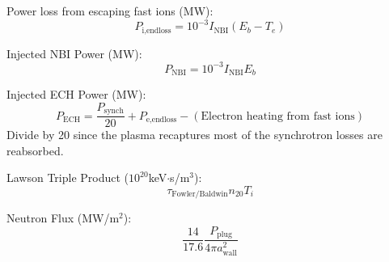 Power loss from escaping fast ions (MW):
\begin{equation}
    P_{\text{i,endloss}} = 10^{-3} I_{\text{NBI}} \left(E_b-T_e\right)
\end{equation}

Injected NBI Power (MW):
\begin{equation}
    P_{\text{NBI}} = 10^{-3}I_{\text{NBI}} E_b
\end{equation}

Injected ECH Power (MW): 
\begin{equation}
    P_{\text{ECH}} = \frac{P_{\text{synch}}}{20} +P_{\text{e,endloss}} - \left(\text{Electron heating from fast ions}\right)
\end{equation}
Divide by 20 since the plasma recaptures most of the synchrotron losses are reabsorbed.

Lawson Triple Product ($10^{20}$keV$\cdot$s/m$^3$):
\begin{equation}
    \tau_{\text{Fowler/Baldwin}} n_{20} T_i
\end{equation}

Neutron Flux (MW/m$^2$): 
\begin{equation}
    \frac{14}{17.6}\frac{P_{\text{plug}}}{4\pi a_{\text{wall}}^2}
\end{equation}


